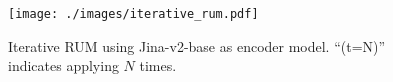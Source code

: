 
\begin{figure}[!t]
    \centering
    \texttt{[image: ./images/iterative\_rum.pdf]}
    \caption{Iterative RUM using Jina-v2-base as encoder model. ``\RunnerUpMiningShort{}(t=N)'' indicates applying \RunnerUpMiningShort{} $N$ times.}
    \label{fig:iterative}
    \vspace{-18pt}
\end{figure}
